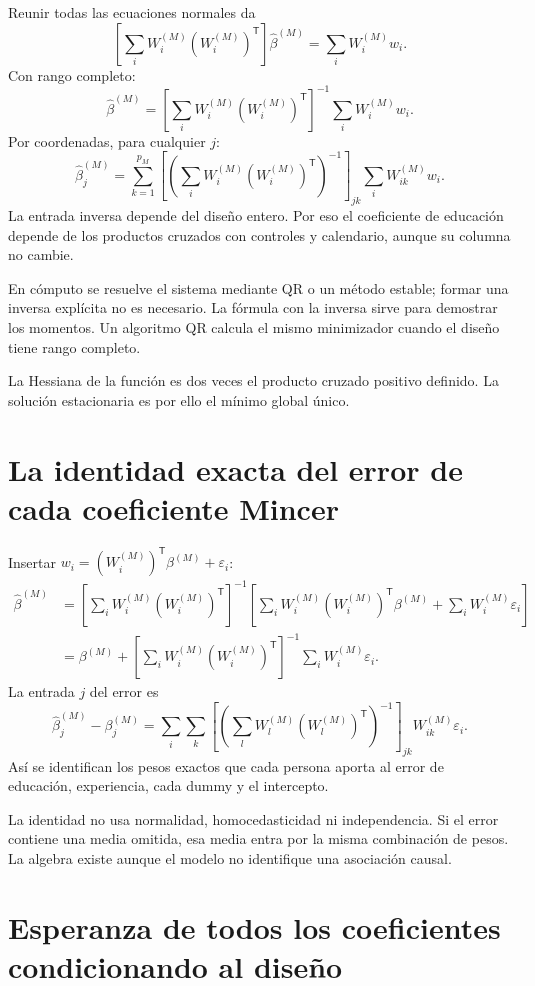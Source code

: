 \documentclass[11pt,a4paper]{article}
\begin{document}
Reunir todas las ecuaciones normales da
\[
\left[\sum_iW_i^{(M)}(W_i^{(M)})^{\mathsf T}\right]\widehat\beta^{(M)}
=\sum_iW_i^{(M)}w_i.
\]
Con rango completo:
\[
\widehat\beta^{(M)}
=\left[\sum_iW_i^{(M)}(W_i^{(M)})^{\mathsf T}\right]^{-1}
\sum_iW_i^{(M)}w_i.
\]
Por coordenadas, para cualquier $j$:
\[
\widehat\beta_j^{(M)}
=\sum_{k=1}^{p_M}
\left[\left(\sum_iW_i^{(M)}(W_i^{(M)})^{\mathsf T}\right)^{-1}\right]_{jk}
\sum_iW_{ik}^{(M)}w_i.
\]
La entrada inversa depende del diseño entero. Por eso el coeficiente de educación depende de los productos cruzados con controles y calendario, aunque su columna no cambie.

En cómputo se resuelve el sistema mediante QR o un método estable; formar una inversa explícita no es necesario. La fórmula con la inversa sirve para demostrar los momentos. Un algoritmo QR calcula el mismo minimizador cuando el diseño tiene rango completo.

La Hessiana de la función es dos veces el producto cruzado positivo definido. La solución estacionaria es por ello el mínimo global único.

\clearpage
\section{La identidad exacta del error de cada coeficiente Mincer}

Insertar $w_i=(W_i^{(M)})^{\mathsf T}\beta^{(M)}+\varepsilon_i$:
\[
\begin{aligned}
\widehat\beta^{(M)}
&=\left[\sum_iW_i^{(M)}(W_i^{(M)})^{\mathsf T}\right]^{-1}
\left[\sum_iW_i^{(M)}(W_i^{(M)})^{\mathsf T}\beta^{(M)}
+\sum_iW_i^{(M)}\varepsilon_i\right]\\
&=\beta^{(M)}
+\left[\sum_iW_i^{(M)}(W_i^{(M)})^{\mathsf T}\right]^{-1}
\sum_iW_i^{(M)}\varepsilon_i.
\end{aligned}
\]
La entrada $j$ del error es
\[
\widehat\beta_j^{(M)}-\beta_j^{(M)}
=\sum_i\sum_k
\left[\left(\sum_lW_l^{(M)}(W_l^{(M)})^{\mathsf T}\right)^{-1}\right]_{jk}
W_{ik}^{(M)}\varepsilon_i.
\]
Así se identifican los pesos exactos que cada persona aporta al error de educación, experiencia, cada dummy y el intercepto.

La identidad no usa normalidad, homocedasticidad ni independencia. Si el error contiene una media omitida, esa media entra por la misma combinación de pesos. La algebra existe aunque el modelo no identifique una asociación causal.

\clearpage
\section{Esperanza de todos los coeficientes condicionando al diseño}
\end{document}

